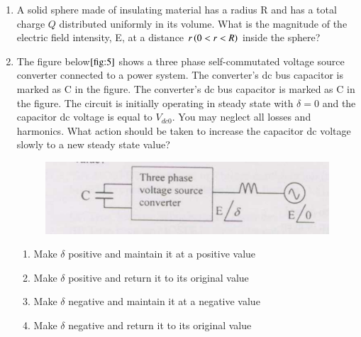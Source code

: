 \documentclass[journal]{IEEEtran}
\numberwithin{equation}{enumi}
\numberwithin{figure}{enumi}
\begin{document}
\begin{enumerate}
\begin{enumerate}
\end{enumerate}
\bigskip
\item A solid sphere made of insulating material has a radius R and has a total charge $Q$ distributed uniformly in its volume. What is the magnitude of the electric field intensity, E, at a distance $r\left(0<r<R\right)$ inside the sphere?
\begin{enumerate}
\end{enumerate}
\bigskip
\item The figure below$\ref{fig:5}$ shows a three phase self-commutated voltage source converter connected to a power system. The converter's dc bus capacitor is marked as C in the figure. The converter's dc bus capacitor is marked as C in the figure. The circuit is initially operating in steady state with $\delta=0$ and the capacitor dc voltage is equal to $V_{dc0}$. You may neglect all losses and harmonics. What action should be taken to increase the capacitor dc voltage slowly to a new steady state value?
\begin{figure}[!ht]
    \centering
    \includegraphics[width=\linewidth]{figs/5.png}
    \caption{}
    \label{fig:5}
    \end{figure}
\begin{enumerate}
        \item Make $\delta$ positive and maintain it at a positive value
        \item Make $\delta$ positive and return it to its original value
        \item Make $\delta$ negative and maintain it at a negative value
        \item Make $\delta$ negative and return it to its original value

\end{enumerate}
\end{enumerate}
\end{document}
